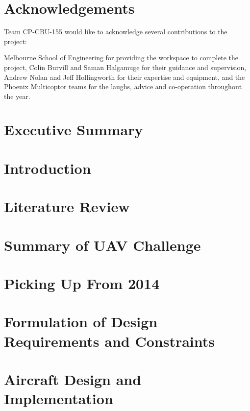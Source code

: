 \documentclass[]{article}
\begin{document}
\vfill
\vfill

\newpage

\section*{Acknowledgements}
Team CP-CBU-155 would like to acknowledge several contributions to the project:

Melbourne School of Engineering for providing the workspace to complete the project, Colin Burvill and Saman Halgamuge for their guidance and supervision, Andrew Nolan and Jeff Hollingworth for their expertise and equipment, and the Phoenix Multicoptor teams for the laughs, advice and co-operation throughout the year.



\newpage
\section{Executive Summary}


\section{Introduction}


\section{Literature Review}


\section{Summary of UAV Challenge}


\section{Picking Up From 2014}


\section{Formulation of Design Requirements and Constraints}


\section{Aircraft Design and Implementation}

\end{document}

